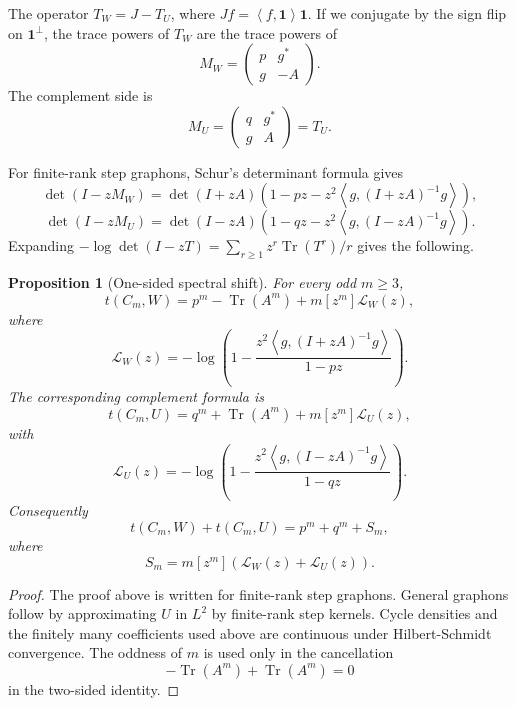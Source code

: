 \documentclass[11pt]{article}
\newtheorem{proposition}[theorem]{Proposition}
\newcommand{\one}{\mathbf 1}
\newcommand{\cL}{\mathcal L}
\newcommand{\ip}[2]{\left\langle #1,#2\right\rangle}
\newcommand{\Tr}{\operatorname{Tr}}
\begin{document}
The operator $T_W=J-T_U$, where $Jf=\ip{f}{\one}\one$.  If we conjugate
by the sign flip on $\one^\perp$, the trace powers of $T_W$ are the trace
powers of
\begin{equation}\label{eq:MW}
        M_W=
        \begin{pmatrix}
        p&g^*\\
        g&-A
        \end{pmatrix}.
\end{equation}
The complement side is
\begin{equation}\label{eq:MU}
        M_U=
        \begin{pmatrix}
        q&g^*\\
        g&A
        \end{pmatrix}=T_U.
\end{equation}

For finite-rank step graphons, Schur's determinant formula gives
\[
 \det(I-zM_W)=\det(I+zA)\left(1-pz-z^2\ip{g}{(I+zA)^{-1}g}\right),
\]
\[
 \det(I-zM_U)=\det(I-zA)\left(1-qz-z^2\ip{g}{(I-zA)^{-1}g}\right).
\]
Expanding $-\log\det(I-zT)=\sum_{r\ge1}z^r\Tr(T^r)/r$ gives the following.

\begin{proposition}[One-sided spectral shift]\label{prop:one-sided-shift}
For every odd $m\ge3$,
\begin{equation}\label{eq:one-sided-shift}
        t(C_m,W)=p^m-\Tr(A^m)+m[z^m]\cL_W(z),
\end{equation}
where
\[
        \cL_W(z)=
        -\log\left(
        1-\frac{z^2\ip{g}{(I+zA)^{-1}g}}{1-pz}
        \right).
\]
The corresponding complement formula is
\[
        t(C_m,U)=q^m+\Tr(A^m)+m[z^m]\cL_U(z),
\]
with
\[
        \cL_U(z)=
        -\log\left(
        1-\frac{z^2\ip{g}{(I-zA)^{-1}g}}{1-qz}
        \right).
\]
Consequently
\begin{equation}\label{eq:two-sided-shift}
        t(C_m,W)+t(C_m,U)=p^m+q^m+S_m,
\end{equation}
where
\[
        S_m=m[z^m](\cL_W(z)+\cL_U(z)).
\]
\end{proposition}

\begin{proof}
The proof above is written for finite-rank step graphons.  General
graphons follow by approximating $U$ in $L^2$ by finite-rank step kernels.
Cycle densities and the finitely many coefficients used above are
continuous under Hilbert-Schmidt convergence.  The oddness of $m$ is used
only in the cancellation
\[
        -\Tr(A^m)+\Tr(A^m)=0
\]
in the two-sided identity.
\end{proof}
\end{document}
